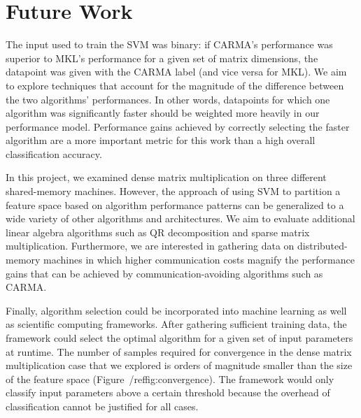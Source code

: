 \section{Future Work}
\label{s:future}

The input used to train the SVM was binary: if CARMA's performance was superior to MKL's performance for a given set of matrix dimensions, the datapoint was given with the CARMA label (and vice versa for MKL).
We aim to explore techniques that account for the magnitude of the difference between the two algorithms' performances.
In other words, datapoints for which one algorithm was significantly faster should be weighted more heavily in our performance model.
Performance gains achieved by correctly selecting the faster algorithm are a more important metric for this work than a high overall classification accuracy.

In this project, we examined dense matrix multiplication on three different shared-memory machines.
However, the approach of using SVM to partition a feature space based on algorithm performance patterns can be generalized to a wide variety of other algorithms and architectures.
We aim to evaluate additional linear algebra algorithms such as QR decomposition and sparse matrix multiplication.
Furthermore, we are interested in gathering data on distributed-memory machines in which higher communication costs magnify the performance gains that can be achieved by communication-avoiding algorithms such as CARMA.

Finally, algorithm selection could be incorporated into machine learning as well as scientific computing frameworks.
After gathering sufficient training data, the framework could select the optimal algorithm for a given set of input parameters at runtime.
The number of samples required for convergence in the dense matrix multiplication case that we explored is orders of magnitude smaller than the size of the feature space (Figure~/ref{fig:convergence}).
The framework would only classify input parameters above a certain threshold because the overhead of classification cannot be justified for all cases.
